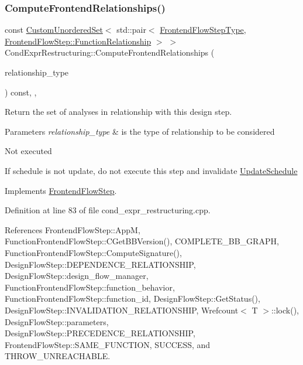 \subsubsection{\texorpdfstring{Compute\+Frontend\+Relationships()}{ComputeFrontendRelationships()}}
{\footnotesize\ttfamily const \hyperlink{classCustomUnorderedSet}{Custom\+Unordered\+Set}$<$ std\+::pair$<$ \hyperlink{frontend__flow__step_8hpp_afeb3716c693d2b2e4ed3e6d04c3b63bb}{Frontend\+Flow\+Step\+Type}, \hyperlink{classFrontendFlowStep_af7cf30f2023e5b99e637dc2058289ab0}{Frontend\+Flow\+Step\+::\+Function\+Relationship} $>$ $>$ Cond\+Expr\+Restructuring\+::\+Compute\+Frontend\+Relationships (\begin{DoxyParamCaption}\item[{const \hyperlink{classDesignFlowStep_a723a3baf19ff2ceb77bc13e099d0b1b7}{Design\+Flow\+Step\+::\+Relationship\+Type}}]{relationship\+\_\+type }\end{DoxyParamCaption}) const\hspace{0.3cm}{\ttfamily [override]}, {\ttfamily [private]}, {\ttfamily [virtual]}}



Return the set of analyses in relationship with this design step. 


\begin{DoxyParams}{Parameters}
{\em relationship\+\_\+type} & is the type of relationship to be considered \\
\hline
\end{DoxyParams}
Not executed

If schedule is not update, do not execute this step and invalidate \hyperlink{classUpdateSchedule}{Update\+Schedule} 

Implements \hyperlink{classFrontendFlowStep_abeaff70b59734e462d347ed343dd700d}{Frontend\+Flow\+Step}.



Definition at line 83 of file cond\+\_\+expr\+\_\+restructuring.\+cpp.



References Frontend\+Flow\+Step\+::\+AppM, Function\+Frontend\+Flow\+Step\+::\+C\+Get\+B\+B\+Version(), C\+O\+M\+P\+L\+E\+T\+E\+\_\+\+B\+B\+\_\+\+G\+R\+A\+PH, Function\+Frontend\+Flow\+Step\+::\+Compute\+Signature(), Design\+Flow\+Step\+::\+D\+E\+P\+E\+N\+D\+E\+N\+C\+E\+\_\+\+R\+E\+L\+A\+T\+I\+O\+N\+S\+H\+IP, Design\+Flow\+Step\+::design\+\_\+flow\+\_\+manager, Function\+Frontend\+Flow\+Step\+::function\+\_\+behavior, Function\+Frontend\+Flow\+Step\+::function\+\_\+id, Design\+Flow\+Step\+::\+Get\+Status(), Design\+Flow\+Step\+::\+I\+N\+V\+A\+L\+I\+D\+A\+T\+I\+O\+N\+\_\+\+R\+E\+L\+A\+T\+I\+O\+N\+S\+H\+IP, Wrefcount$<$ T $>$\+::lock(), Design\+Flow\+Step\+::parameters, Design\+Flow\+Step\+::\+P\+R\+E\+C\+E\+D\+E\+N\+C\+E\+\_\+\+R\+E\+L\+A\+T\+I\+O\+N\+S\+H\+IP, Frontend\+Flow\+Step\+::\+S\+A\+M\+E\+\_\+\+F\+U\+N\+C\+T\+I\+ON, S\+U\+C\+C\+E\+SS, and T\+H\+R\+O\+W\+\_\+\+U\+N\+R\+E\+A\+C\+H\+A\+B\+LE.

